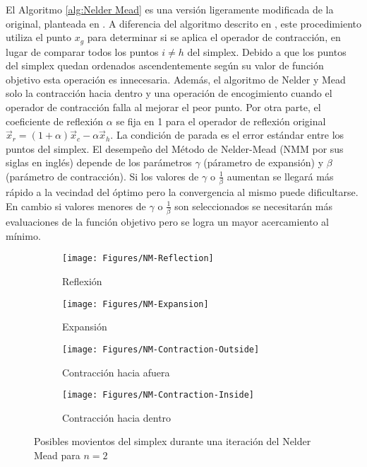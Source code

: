 El Algoritmo \ref{alg:Nelder Mead} es una versión ligeramente modificada de la original, planteada en \cite{deb_optimization_2004}. A diferencia del algoritmo descrito en \cite{nelder_simplex_1965}, este procedimiento utiliza el punto $x_g$ para determinar si se aplica el operador de contracción, en lugar de comparar todos los puntos $i \neq h$ del simplex. Debido a que los puntos del simplex quedan ordenados ascendentemente según su valor de función objetivo esta operación es innecesaria. Además, el algoritmo de Nelder y Mead solo la contracción hacia dentro y una operación de encogimiento cuando el operador de contracción falla al mejorar el peor punto. Por otra parte, el coeficiente de reflexión $\alpha$ se fija en 1 para el operador de reflexión original $\vec{x}_r=(1+\alpha)\vec{x}_c -\alpha\vec{x}_h$. La condición de parada es el error estándar entre los puntos del simplex. El desempeño del Método de Nelder-Mead (NMM por sus siglas en inglés) depende de los parámetros $\gamma$ (párametro de expansión) y $\beta$ (parámetro de contracción). Si los valores de $\gamma$ o $\frac{1}{\beta}$ aumentan se llegará más rápido a la vecindad del óptimo pero la convergencia al mismo puede dificultarse. En cambio  si valores menores de $\gamma$ o $\frac{1}{\beta}$  son seleccionados se necesitarán más evaluaciones de la función objetivo pero se logra un mayor acercamiento al mínimo. 
\begin{figure}
	\centering
	\begin{subfigure}[b]{0.49\linewidth}
		\texttt{[image: Figures/NM-Reflection]}
		\caption{Reflexión} \label{fig:R} 
	\end{subfigure}
	\begin{subfigure}[b]{0.49\linewidth}
	\texttt{[image: Figures/NM-Expansion]}
	\caption{Expansión} \label{fig:R} 
\end{subfigure}
	\begin{subfigure}[b]{0.49\linewidth}
	\texttt{[image: Figures/NM-Contraction-Outside]}
	\caption{Contracción hacia afuera} \label{fig:R} 
\end{subfigure}
	\begin{subfigure}[b]{0.49\linewidth}
	\texttt{[image: Figures/NM-Contraction-Inside]}
	\caption{Contracción hacia dentro} \label{fig:R} 
\end{subfigure}

	\caption{Posibles movientos del simplex durante una iteración del Nelder Mead para $n=2$} \label{Posibles movientos del simplex durante una iteración del Nleder Mead} 
	
\end{figure}


